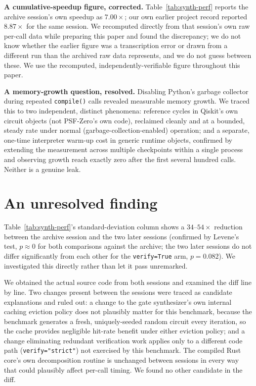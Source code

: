 \documentclass[11pt]{article}
\begin{document}
\textbf{A cumulative-speedup figure, corrected.} Table~\ref{tab:synth-perf}
reports the archive session's own speedup as $7.00\times$; our own
earlier project record reported $8.87\times$ for the same session. We
recomputed directly from that session's own raw per-call data while
preparing this paper and found the discrepancy; we do not know whether
the earlier figure was a transcription error or drawn from a different
run than the archived raw data represents, and we do not guess between
these. We use the recomputed, independently-verifiable figure
throughout this paper.

\textbf{A memory-growth question, resolved.} Disabling Python's garbage
collector during repeated \texttt{compile()} calls revealed measurable
memory growth. We traced this to two independent, distinct phenomena:
reference cycles in Qiskit's own circuit objects (not PSF-Zero's own
code), reclaimed cleanly and at a bounded, steady rate under normal
(garbage-collection-enabled) operation; and a separate, one-time
interpreter warm-up cost in generic runtime objects, confirmed by
extending the measurement across multiple checkpoints within a single
process and observing growth reach exactly zero after the first
several hundred calls. Neither is a genuine leak.

\section{An unresolved finding}
\label{sec:variance}

Table~\ref{tab:synth-perf}'s standard-deviation column shows a
$34$--$54\times$ reduction between the archive session and the two
later sessions (confirmed by Levene's test, $p \approx 0$ for both
comparisons against the archive; the two later sessions do not differ
significantly from each other for the \texttt{verify=True} arm,
$p=0.082$). We investigated this directly rather than let it pass
unremarked.

We obtained the actual source code from both sessions and examined the
diff line by line. Two changes present between the sessions were
traced as candidate explanations and ruled out: a change to the gate
synthesizer's own internal caching eviction policy does not
plausibly matter for this benchmark, because the benchmark generates a
fresh, uniquely-seeded random circuit every iteration, so the cache
provides negligible hit-rate benefit under either eviction policy; and
a change eliminating redundant verification work applies only to a
different code path (\texttt{verify="strict"}) not exercised by this
benchmark. The compiled Rust core's own decomposition routine is
unchanged between sessions in every way that could plausibly affect
per-call timing. We found no other candidate in the diff.
\end{document}
